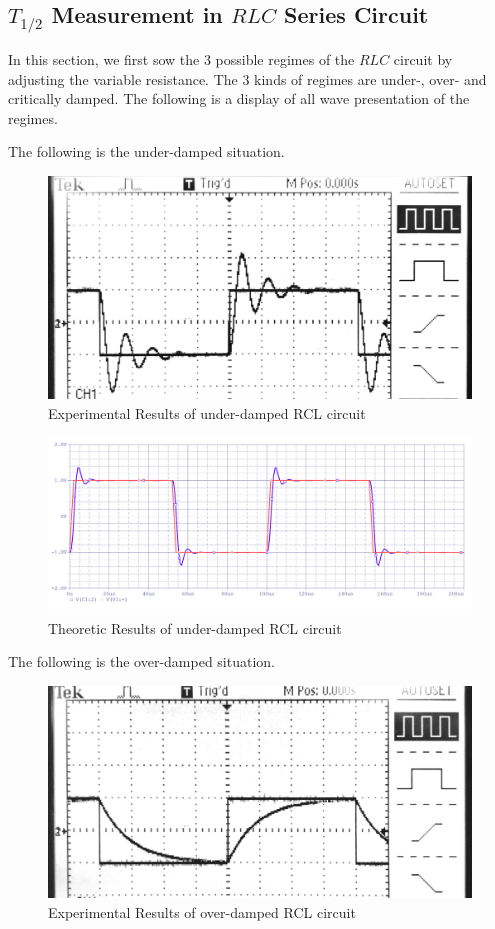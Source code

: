 \documentclass[a4paper]{article}
\begin{document}
\subsection{$T_{1/2}$ Measurement in $RLC$ Series Circuit}

In this section, we first sow the 3 possible regimes of the $RLC$ circuit by adjusting the variable resistance. The 3 kinds of regimes are under-, over- and critically damped.
The following is a display of all wave presentation of the regimes.

The following is the under-damped situation.

\begin{figure}[H]
	\center
	\includegraphics[width=12cm]{under_exp.jpg}
	\caption{Experimental Results of under-damped RCL circuit}
\end{figure}

\begin{figure}[H]
	\center
	\includegraphics[width=12cm]{under_theo.png}
	\caption{Theoretic Results of under-damped RCL circuit}
\end{figure}


The following is the over-damped situation.

\begin{figure}[H]
	\center
	\includegraphics[width=12cm]{over_exp.jpg}
	\caption{Experimental Results of over-damped RCL circuit}
\end{figure}
\end{document}
